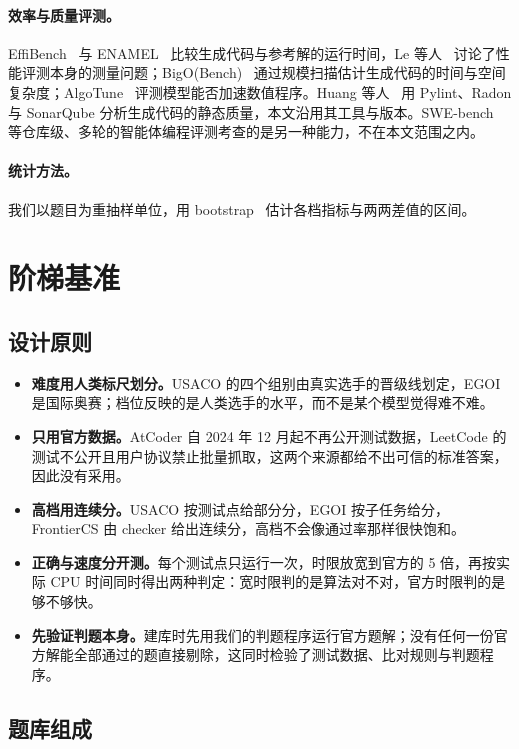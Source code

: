 \documentclass[11pt,a4paper,fontset=none]{ctexart}
\newcommand{\lead}[1]{\textbf{#1}\quad}
\begin{document}
\paragraph{效率与质量评测。}EffiBench~\cite{effibench} 与 ENAMEL~\cite{enamel} 比较生成代码与参考解的运行时间，Le 等人~\cite{perfbench} 讨论了性能评测本身的测量问题；BigO(Bench)~\cite{bigo} 通过规模扫描估计生成代码的时间与空间复杂度；AlgoTune~\cite{algotune} 评测模型能否加速数值程序。Huang 等人~\cite{quality} 用 Pylint、Radon 与 SonarQube 分析生成代码的静态质量，本文沿用其工具与版本。SWE-bench~\cite{swebench} 等仓库级、多轮的智能体编程评测考查的是另一种能力，不在本文范围之内。

\paragraph{统计方法。}我们以题目为重抽样单位，用 bootstrap~\cite{efron1979} 估计各档指标与两两差值的区间。

\section{阶梯基准}
\label{sec:bench}

\subsection{设计原则}

\begin{itemize}[leftmargin=1.6em]
  \item \lead{难度用人类标尺划分。}USACO 的四个组别由真实选手的晋级线划定，EGOI 是国际奥赛；档位反映的是人类选手的水平，而不是某个模型觉得难不难。
  \item \lead{只用官方数据。}AtCoder 自 2024 年 12 月起不再公开测试数据，LeetCode 的测试不公开且用户协议禁止批量抓取，这两个来源都给不出可信的标准答案，因此没有采用。
  \item \lead{高档用连续分。}USACO 按测试点给部分分，EGOI 按子任务给分，FrontierCS 由 checker 给出连续分，高档不会像通过率那样很快饱和。
  \item \lead{正确与速度分开测。}每个测试点只运行一次，时限放宽到官方的 5 倍，再按实际 CPU 时间同时得出两种判定：宽时限判的是算法对不对，官方时限判的是够不够快。
  \item \lead{先验证判题本身。}建库时先用我们的判题程序运行官方题解；没有任何一份官方解能全部通过的题直接剔除，这同时检验了测试数据、比对规则与判题程序。
\end{itemize}

\subsection{题库组成}
\end{document}
